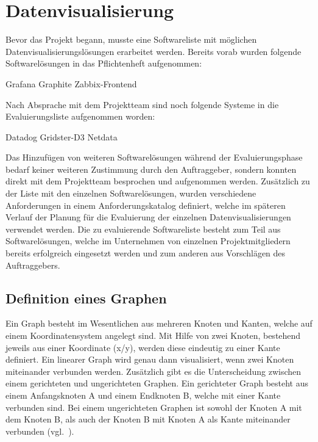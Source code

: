 \section{Datenvisualisierung}
\label{sec:datenvisualisierung}
Bevor das Projekt begann, musste eine Softwareliste mit möglichen
Datenvisualisierungslösungen erarbeitet werden. Bereits vorab wurden folgende
Softwarelösungen in das Pflichtenheft aufgenommen:

\begin{outline}
  \1 Grafana
  \1 Graphite
  \1 Zabbix\hyp{}Frontend
\end{outline}

Nach Absprache mit dem Projektteam sind noch folgende Systeme in die
Evaluierungsliste aufgenommen worden:

\begin{outline}
  \1 Datadog
  \1 Gridster\hyp{}D3
  \1 Netdata
\end{outline}

Das Hinzufügen von weiteren Softwarelösungen während der Evaluierungsphase
bedarf keiner weiteren Zustimmung durch den Auftraggeber, sondern konnten direkt
mit dem Projektteam besprochen und aufgenommen werden. Zusätzlich zu der Liste
mit den einzelnen Softwarelösungen, wurden verschiedene Anforderungen in einem
Anforderungskatalog definiert, welche im späteren Verlauf der Planung für die
Evaluierung der einzelnen Datenvisualisierungen verwendet werden. Die zu
evaluierende Softwareliste besteht zum Teil aus Softwarelösungen, welche im
Unternehmen von einzelnen Projektmitgliedern bereits erfolgreich eingesetzt
werden und zum anderen aus Vorschlägen des Auftraggebers.
\mr%

\subsection{Definition eines Graphen}
\label{definition_eines_graphen}
Ein Graph besteht im Wesentlichen aus mehreren Knoten und Kanten, welche auf
einem Koordinatensystem angelegt sind. Mit Hilfe von zwei Knoten, bestehend
jeweils aus einer Koordinate (x/y), werden diese eindeutig zu einer Kante
definiert. Ein linearer Graph wird genau dann visualisiert, wenn zwei Knoten
miteinander verbunden werden. Zusätzlich gibt es die Unterscheidung zwischen
einem gerichteten und ungerichteten Graphen. Ein gerichteter Graph besteht aus
einem Anfangsknoten A und einem Endknoten B, welche mit einer Kante verbunden
sind. Bei einem ungerichteten Graphen ist sowohl der Knoten A mit dem Knoten B,
als auch der Knoten B mit Knoten A als Kante miteinander
verbunden (vgl.~\cite{kaiser2008c}).

